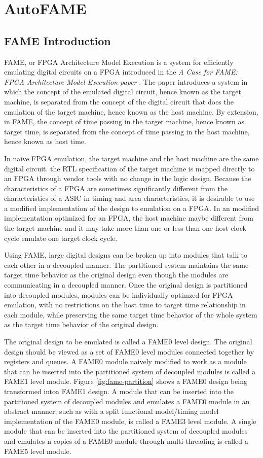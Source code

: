 \section{AutoFAME}
\subsection{FAME Introduction}
FAME, or FPGA Architecture Model Execution is a system for efficiently emulating digital circuits on a FPGA introduced in the \textit{A Case for FAME: FPGA Architecture Model Execution paper} \cite{FAME:2010}. The paper introduces a system in which the concept of the emulated digital circuit, hence known as the target machine, is separated from the concept of the digital circuit that does the emulation of the target machine, hence known as the host machine. By extension, in FAME, the concept of time passing in the target machine, hence known as target time, is separated from the concept of time passing in the host machine, hence known as host time. 

In naive FPGA emulation, the target machine and the host machine are the same digital circuit. the RTL specification of the target machine is mapped directly to an FPGA through vendor tools with no change in the logic design. Because the characteristics of a FPGA are sometimes significantly different from the characteristics of a ASIC in timing and area characteristics, it is desirable to use a modified implementation of the design to emulation on a FPGA. In an modified implementation optimized for an FPGA, the host machine maybe different from the target machine and it may take more than one or less than one host clock cycle emulate one target clock cycle.

Using FAME, large digital designs can be broken up into modules that talk to each other in a decoupled manner. The partitioned system maintains the same target time behavior as the original design even though the modules are communicating in a decoupled manner. Once the original design is partitioned into decoupled modules, modules can be individually optimzed for FPGA emulation, with no restrictions on the host time to target time relationship in each module, while preserving the same target time behavior of the whole system as the target time behavior of the original design.

The original design to be emulated is called a FAME0 level design. The original design should be viewed as a set of FAME0 level modules connected together by registers and queues. A FAME0 module naively modified to work as a module that can be inserted into the partitioned system of decoupled modules is called a FAME1 level module. Figure \ref{fig:fame-partition} shows a FAME0 design being transformed intoa FAME1 design. A module that can be inserted into the partitioned system of decoupled modules and emulates a FAME0 module in an abstract manner, such as with a split functional model/timing model implementation of the FAME0 module, is called a FAME3 level module. A single module that can be inserted into the partitioned system of decoupled modules and emulates n copies of a FAME0 module through multi-threading is called a FAME5 level module. 

